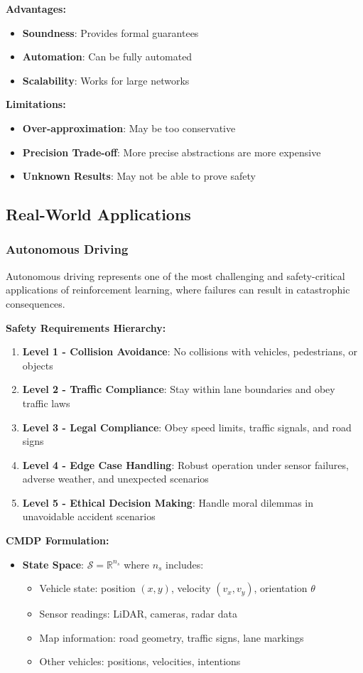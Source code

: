 \documentclass[12pt]{article}
\begin{document}
{{{{\textbf{Advantages:}
\begin{itemize}
\item \textbf{Soundness}: Provides formal guarantees
\item \textbf{Automation}: Can be fully automated
\item \textbf{Scalability}: Works for large networks
\end{itemize}

\textbf{Limitations:}
\begin{itemize}
\item \textbf{Over-approximation}: May be too conservative
\item \textbf{Precision Trade-off}: More precise abstractions are more expensive
\item \textbf{Unknown Results}: May not be able to prove safety
\end{itemize}

\subsection{Real-World Applications}

\subsubsection{Autonomous Driving}

Autonomous driving represents one of the most challenging and safety-critical applications of reinforcement learning, where failures can result in catastrophic consequences.

\textbf{Safety Requirements Hierarchy:}
\begin{enumerate}
\item \textbf{Level 1 - Collision Avoidance}: No collisions with vehicles, pedestrians, or objects
\item \textbf{Level 2 - Traffic Compliance}: Stay within lane boundaries and obey traffic laws
\item \textbf{Level 3 - Legal Compliance}: Obey speed limits, traffic signals, and road signs
\item \textbf{Level 4 - Edge Case Handling}: Robust operation under sensor failures, adverse weather, and unexpected scenarios
\item \textbf{Level 5 - Ethical Decision Making}: Handle moral dilemmas in unavoidable accident scenarios
\end{enumerate}

\textbf{CMDP Formulation:}
\begin{itemize}
\item \textbf{State Space}: $\mathcal{S} = \mathbb{R}^{n_s}$ where $n_s$ includes:
\begin{itemize}
\item Vehicle state: position $(x,y)$, velocity $(v_x, v_y)$, orientation $\theta$
\item Sensor readings: LiDAR, cameras, radar data
\item Map information: road geometry, traffic signs, lane markings
\item Other vehicles: positions, velocities, intentions
\end{itemize}


\end{itemize}}}}}
\end{document}
